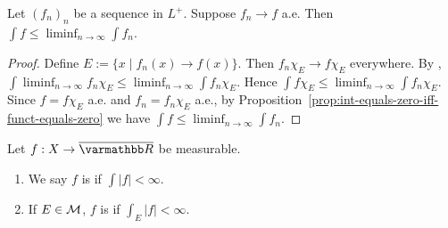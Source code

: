 \begin{corollary}
    Let $(f_n)_n$ be a sequence in $L^+$. Suppose $f_n \rightarrow f$ a.e. Then $\int f \leq \liminf_{n \rightarrow \infty}\int f_n$.
\end{corollary}
    \begin{proof}
        Define $E:= \{x \mid f_n(x) \rightarrow f(x)\}$. Then $f_n \chi_E \rightarrow f \chi_E$ everywhere. By , $\int \liminf_{n \rightarrow \infty}f_n\chi_E \leq \liminf_{n \rightarrow \infty} \int f_n \chi_E$. Hence $\int f \chi_E \leq \liminf_{n \rightarrow \infty} \int f_n \chi_E$. Since $f = f \chi_E$ a.e. and $f_n = f_n \chi_E$ a.e., by Proposition~\ref{prop:int-equals-zero-iff-funct-equals-zero} we have $\int f  \leq \liminf_{n \rightarrow \infty} \int f_n $.
    \end{proof}

\begin{definition}
    Let $f:X \rightarrow \overline{\bfR}$ be measurable.
        \begin{enumerate}[label = (\arabic*),itemsep=1pt,topsep=3pt]
            \item We say $f$ is  if $\int |f| < \infty$.
            \item If $E \in \mathcal{M}$, $f$ is  if $\int_E |f| < \infty$.
        \end{enumerate} 
\end{definition}

